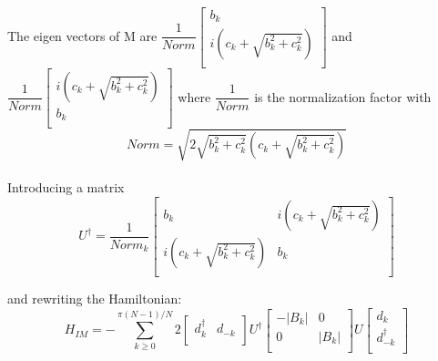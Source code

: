 \documentclass[11pt,a4paper]{article}
\begin{document}
	    	    The eigen vectors of M are $\dfrac{1}{Norm}\begin{bmatrix}
	    	    b_{k}\\i(c_{k}+\sqrt{b_{k}^{2}+c_{k}^{2}})\\
	    	    \end{bmatrix}  $ and $\dfrac{1}{Norm}\begin{bmatrix}
	    	    i(c_{k}+\sqrt{b_{k}^{2}+c_{k}^{2}})\\b_{k}\\
	    	    \end{bmatrix}  $ where $\dfrac{1}{Norm}$ is the normalization factor with 
	    	    \begin{equation}
	    	     Norm = \sqrt{2\sqrt{b_{k}^{2}+c_{k}^{2}}(c_{k}+\sqrt{b_{k}^{2}+c_{k}^{2}})}
	    	     \end{equation}
	    	   
	    	    \paragraph{   }
	    	    
	    	    Introducing a matrix 
	    	    \begin{equation}
	    	    U^{\dagger} = \dfrac{1}{Norm_{k}}\begin{bmatrix}
	    	    b_{k} & i(c_{k}+\sqrt{b_{k}^{2}+c_{k}^{2}})\\ i(c_{k}+\sqrt{b_{k}^{2}+c_{k}^{2}})& b_{k}\\
	    	    \end{bmatrix} 
	    	    \end{equation}
	    	    
	    	     and rewriting the Hamiltonian:
	    \begin{equation}
	      H_{IM} = -\sum_{k\geq 0}^{ \pi (N-1)/N}2\begin{bmatrix}
	      d_{k}^{\dagger} & d_{-k}\\
	      \end{bmatrix} U^{\dagger} \begin{bmatrix}
	     -|B_{k}| & 0\\
	      0 & |B_{k}| \\
	      \end{bmatrix}U\begin{bmatrix}
	      d_{k}\\d_{-k}^{\dagger}\\
	      \end{bmatrix}
	    \end{equation}
	    
\end{document}
